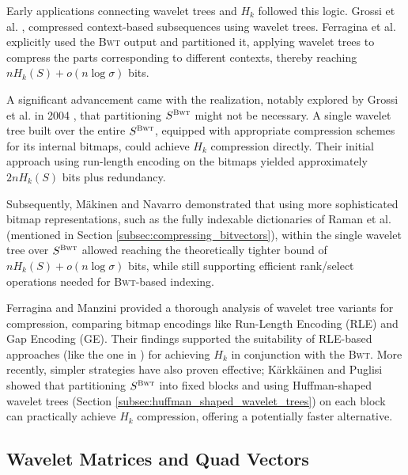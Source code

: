 Early applications connecting wavelet trees and $H_k$ followed this logic. Grossi et al. \cite{GrossiWT2003}, compressed context-based subsequences using wavelet trees. Ferragina et al. \cite{ferragina2004alphabet} explicitly used the \textsc{Bwt} output and partitioned it, applying wavelet trees to compress the parts corresponding to different contexts, thereby reaching $nH_k(S) + o(n \log \sigma)$ bits.

A significant advancement came with the realization, notably explored by Grossi et al. in 2004 \cite{grossi2004indexing}, that partitioning $S^{\textsc{Bwt}}$ might not be necessary. A single wavelet tree built over the entire $S^{\textsc{Bwt}}$, equipped with appropriate compression schemes for its internal bitmaps, could achieve $H_k$ compression directly. Their initial approach using run-length encoding on the bitmaps yielded approximately $2nH_k(S)$ bits plus redundancy.

Subsequently, Mäkinen and Navarro \cite{navarro2007compressed} demonstrated that using more sophisticated bitmap representations, such as the fully indexable dictionaries of Raman et al. \cite{RRR2002} (mentioned in Section \ref{subsec:compressing_bitvectors}), within the single wavelet tree over $S^{\textsc{Bwt}}$ allowed reaching the theoretically tighter bound of $nH_k(S) + o(n \log \sigma)$ bits, while still supporting efficient rank/select operations needed for \textsc{Bwt}-based indexing.

Ferragina and Manzini \cite{TheMyriadVirtuesWT} provided a thorough analysis of wavelet tree variants for compression, comparing bitmap encodings like Run-Length Encoding (RLE) and Gap Encoding (GE). Their findings supported the suitability of RLE-based approaches (like the one in \cite{grossi2004indexing}) for achieving $H_k$ in conjunction with the \textsc{Bwt}. More recently, simpler strategies have also proven effective; Kärkkäinen and Puglisi \cite{karkkainen2011fixed} showed that partitioning $S^{\textsc{Bwt}}$ into fixed blocks and using Huffman-shaped wavelet trees (Section \ref{subsec:huffman_shaped_wavelet_trees}) on each block can practically achieve $H_k$ compression, offering a potentially faster alternative.

\subsection{Wavelet Matrices and Quad Vectors}


